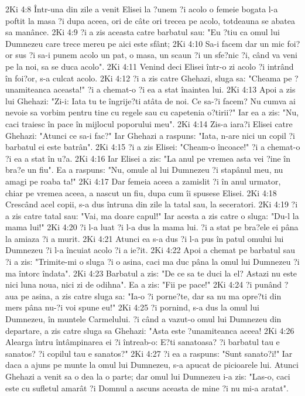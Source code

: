 2Ki 4:8  Într-una din zile a venit Elisei la ?unem ?i acolo o femeie bogata l-a poftit la masa ?i dupa aceea, ori de câte ori trecea pe acolo, totdeauna se abatea sa manânce.
2Ki 4:9  ?i a zis aceasta catre barbatul sau: "Eu ?tiu ca omul lui Dumnezeu care trece mereu pe aici este sfânt;
2Ki 4:10  Sa-i facem dar un mic foi?or sus ?i sa-i punem acolo un pat, o masa, un scaun ?i un sfe?nic ?i, când va veni pe la noi, sa se duca acolo".
2Ki 4:11  Venind deci Elisei într-o zi acolo ?i intrând în foi?or, s-a culcat acolo.
2Ki 4:12  ?i a zis catre Ghehazi, sluga sa: "Cheama pe ?unamiteanca aceasta!" ?i a chemat-o ?i ea a stat înaintea lui.
2Ki 4:13  Apoi a zis lui Ghehazi: "Zi-i: Iata tu te îngrije?ti atâta de noi. Ce sa-?i facem? Nu cumva ai nevoie sa vorbim pentru tine cu regele sau cu capetenia o?tirii?" Iar ea a zis: "Nu, caci traiesc în pace în mijlocul poporului meu".
2Ki 4:14  Zis-a iara?i Elisei catre Ghehazi: "Atunci ce sa-i fac?" Iar Ghehazi a raspuns: "Iata, n-are nici un copil ?i barbatul ei este batrân".
2Ki 4:15  ?i a zis Elisei: "Cheam-o încoace!" ?i a chemat-o ?i ea a stat în u?a.
2Ki 4:16  Iar Elisei a zis: "La anul pe vremea asta vei ?ine în bra?e un fiu". Ea a raspuns: "Nu, omule al lui Dumnezeu ?i stapânul meu, nu amagi pe roaba ta!"
2Ki 4:17  Dar femeia aceea a zamislit ?i în anul urmator, chiar pe vremea aceea, a nascut un fiu, dupa cum îi spusese Elisei.
2Ki 4:18  Crescând acel copii, s-a dus întruna din zile la tatal sau, la seceratori.
2Ki 4:19  ?i a zis catre tatal sau: "Vai, ma doare capul!" Iar acesta a zis catre o sluga: "Du-l la mama lui!"
2Ki 4:20  ?i l-a luat ?i l-a dus la mama lui. ?i a stat pe bra?ele ei pâna la amiaza ?i a murit.
2Ki 4:21  Atunci ea s-a dus ?i l-a pus în patul omului lui Dumnezeu ?i l-a încuiat acolo ?i a ie?it.
2Ki 4:22  Apoi a chemat pe barbatul sau ?i a zis: "Trimite-mi o sluga ?i o asina, caci ma duc pâna la omul lui Dumnezeu ?i ma întorc îndata".
2Ki 4:23  Barbatul a zis: "De ce sa te duci la el? Astazi nu este nici luna noua, nici zi de odihna". Ea a zis: "Fii pe pace!"
2Ki 4:24  ?i punând ?aua pe asina, a zis catre sluga sa: "Ia-o ?i porne?te, dar sa nu ma opre?ti din mers pâna nu-?i voi spune eu!"
2Ki 4:25  ?i pornind, s-a dus la omul lui Dumnezeu, în muntele Carmelului. ?i când a vazut-o omul lui Dumnezeu din departare, a zis catre sluga sa Ghehazi: "Asta este ?unamiteanca aceea!
2Ki 4:26  Alearga întru întâmpinarea ei ?i întreab-o: E?ti sanatoasa? ?i barbatul tau e sanatos? ?i copilul tau e sanatos?"
2Ki 4:27  ?i ea a raspuns: "Sunt sanato?i!" Iar daca a ajuns pe munte la omul lui Dumnezeu, s-a apucat de picioarele lui. Atunci Ghehazi a venit sa o dea la o parte; dar omul lui Dumnezeu i-a zis: "Las-o, caci este cu sufletul amarât ?i Domnul a ascuns aceasta de mine ?i nu mi-a aratat".
